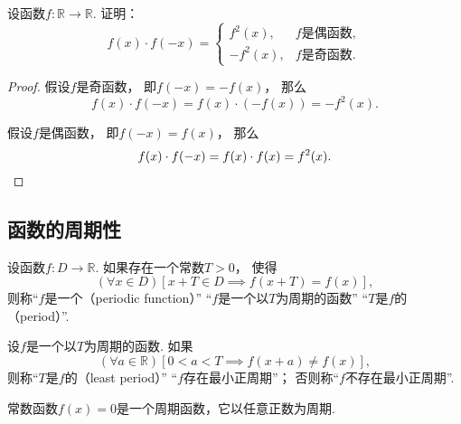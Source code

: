 \begin{example}
设函数\(f\colon\mathbb{R}\to\mathbb{R}\).
证明：\begin{equation*}
	f(x) \cdot f(-x) = \left\{ \begin{array}{rl}
		f^2(x), & \text{$f$是偶函数}, \\
		-f^2(x), & \text{$f$是奇函数}.
	\end{array} \right.
\end{equation*}
\begin{proof}
假设\(f\)是奇函数，
即\(f(-x)=-f(x)\)，
那么\begin{equation*}
	f(x) \cdot f(-x)
	=f(x) \cdot (-f(x))
	=-f^2(x).
\end{equation*}

假设\(f\)是偶函数，
即\(f(-x)=f(x)\)，
那么\begin{equation*}
	f(x) \cdot f(-x)
	=f(x) \cdot f(x)
	=f^2(x).
	\qedhere
\end{equation*}
\end{proof}
\end{example}

\subsection{函数的周期性}
\begin{definition}
设函数\(f\colon D\to\mathbb{R}\).
如果存在一个常数\(T>0\)，
使得\begin{equation*}
	(\forall x \in D)
	[x+T \in D \implies f(x+T) = f(x)],
\end{equation*}
则称“\(f\)是一个（periodic function）”
“\(f\)是一个以\(T\)为周期的函数”
“\(T\)是\(f\)的（period）”.
\end{definition}

\begin{definition}
设\(f\)是一个以\(T\)为周期的函数.
如果\begin{equation*}
	(\forall a\in\mathbb{R})
	[0<a<T \implies f(x+a) \neq f(x)],
\end{equation*}
则称“\(T\)是\(f\)的（least period）”
“\(f\)存在最小正周期”；
否则称“\(f\)不存在最小正周期”.
\end{definition}

\begin{example}\label{example:函数的性质.周期性.常数函数}
常数函数\(f(x) = 0\)是一个周期函数，它以任意正数为周期.
\end{example}

